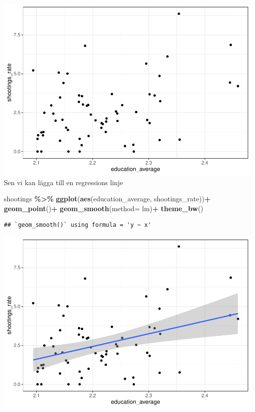 \documentclass[
]{book}
\newenvironment{Shaded}{\begin{snugshade}}{\end{snugshade}}
\newcommand{\AttributeTok}[1]{\textcolor[rgb]{0.13,0.29,0.53}{#1}}
\newcommand{\FunctionTok}[1]{\textcolor[rgb]{0.13,0.29,0.53}{\textbf{#1}}}
\newcommand{\NormalTok}[1]{#1}
\newcommand{\SpecialCharTok}[1]{\textcolor[rgb]{0.81,0.36,0.00}{\textbf{#1}}}
\newcommand{\StringTok}[1]{\textcolor[rgb]{0.31,0.60,0.02}{#1}}
\begin{document}
\includegraphics{_main_files/figure-latex/unnamed-chunk-25-1.pdf}
Sen vi kan lägga till en regressions linje

\begin{Shaded}
\begin{Highlighting}[]
\NormalTok{shootings }\SpecialCharTok{\%\textgreater{}\%} 
  \FunctionTok{ggplot}\NormalTok{(}\FunctionTok{aes}\NormalTok{(education\_average, shootings\_rate))}\SpecialCharTok{+}
  \FunctionTok{geom\_point}\NormalTok{()}\SpecialCharTok{+}
  \FunctionTok{geom\_smooth}\NormalTok{(}\AttributeTok{method=} \StringTok{\textquotesingle{}lm\textquotesingle{}}\NormalTok{)}\SpecialCharTok{+}
  \FunctionTok{theme\_bw}\NormalTok{()}
\end{Highlighting}
\end{Shaded}

\begin{verbatim}
## `geom_smooth()` using formula = 'y ~ x'
\end{verbatim}

\includegraphics{_main_files/figure-latex/unnamed-chunk-26-1.pdf}
\end{document}
